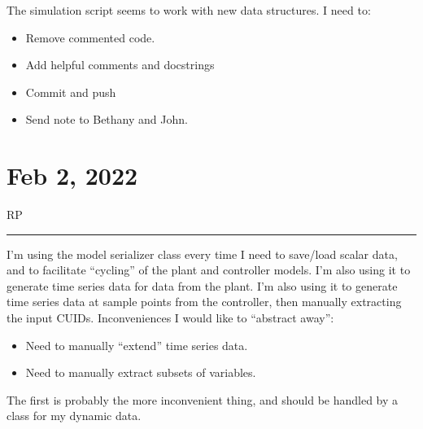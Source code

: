 \documentclass{article}
\newcommand{\RP}{\vspace{0.5cm}RP\vspace{0.2cm}\hrule\vspace{0.2cm}}
\begin{document}
\medskip

The simulation script seems to work with new data structures.
I need to:
\begin{itemize}
  \item Remove commented code.
  \item Add helpful comments and docstrings
  \item Commit and push
  \item Send note to Bethany and John.
\end{itemize}

\section{Feb 2, 2022}

\RP
I'm using the model serializer class every time I need to save/load scalar data,
and to facilitate ``cycling'' of the plant and controller models.
I'm also using it to generate time series data for data from the plant.
I'm also using it to generate time series data at sample points from the
controller, then manually extracting the input CUIDs.
Inconveniences I would like to ``abstract away'':
\begin{itemize}
  \item Need to manually ``extend'' time series data.
  \item Need to manually extract subsets of variables.
\end{itemize}
The first is probably the more inconvenient thing, and should be handled by
a class for my dynamic data.
\end{document}
